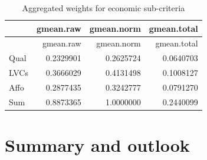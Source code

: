 \documentclass [oneside,10pt,a4paper,ngerman,BCOR10mm,headsepline,parindent,final]{scrartcl}
\begin{document}
    
    \begin{longtable}[]{@{}lrrr@{}}
\caption{Aggregated weights for economic sub-criteria}\tabularnewline
\toprule\noalign{}
& gmean.raw & gmean.norm & gmean.total \\
\midrule\noalign{}
\endfirsthead
\toprule\noalign{}
& gmean.raw & gmean.norm & gmean.total \\
\midrule\noalign{}
\endhead
\bottomrule\noalign{}
\endlastfoot
Qual & 0.2329901 & 0.2625724 & 0.0640703 \\
LVCs & 0.3666029 & 0.4131498 & 0.1008127 \\
Affo & 0.2877435 & 0.3242777 & 0.0791270 \\
Sum & 0.8873365 & 1.0000000 & 0.2440099 \\
\end{longtable}

    
    \hypertarget{summary-and-outlook}{%
\section{Summary and outlook}\label{summary-and-outlook}}


    
    
    \printbibheading[heading=bibnumbered]
    \printbibliography[heading=subbibliography,keyword={URL},title={Online references}]
    \printbibliography[heading=subbibliography,keyword={book},title={Books, technical reports and others}]
    
\end{document}
